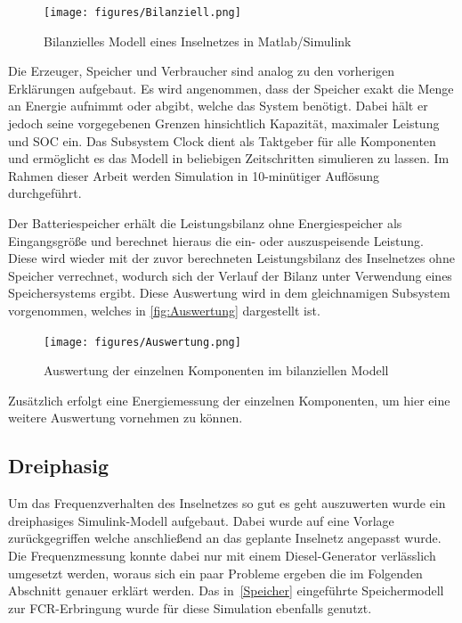 \begin{figure}[H]
	\centering
	\texttt{[image: figures/Bilanziell.png]}
	\caption{Bilanzielles Modell eines Inselnetzes in Matlab/Simulink}
	\label{fig:Bilanziell}
\end{figure}

Die Erzeuger, Speicher und Verbraucher sind analog zu den vorherigen Erklärungen aufgebaut. Es wird angenommen, dass der Speicher exakt die Menge an Energie aufnimmt oder abgibt, welche das System benötigt. Dabei hält er jedoch seine vorgegebenen Grenzen hinsichtlich Kapazität, maximaler Leistung und SOC ein. Das Subsystem Clock dient als Taktgeber für alle Komponenten und ermöglicht es das Modell in beliebigen Zeitschritten simulieren zu lassen. Im Rahmen dieser Arbeit werden Simulation in 10-minütiger Auflösung durchgeführt.


Der Batteriespeicher erhält die Leistungsbilanz ohne Energiespeicher als Eingangsgröße und berechnet hieraus die ein- oder auszuspeisende Leistung. Diese wird wieder mit der zuvor berechneten Leistungsbilanz des Inselnetzes ohne Speicher verrechnet, wodurch sich der Verlauf der Bilanz unter Verwendung eines Speichersystems ergibt. Diese Auswertung wird in dem gleichnamigen Subsystem vorgenommen, welches in \autoref{fig:Auswertung} dargestellt ist.

\begin{figure}[H]
	\centering
	\texttt{[image: figures/Auswertung.png]}
	\caption{Auswertung der einzelnen Komponenten im bilanziellen Modell}
	\label{fig:Auswertung}
\end{figure}

Zusätzlich erfolgt eine Energiemessung der einzelnen Komponenten, um hier eine weitere Auswertung vornehmen zu können.

\subsection{Dreiphasig}\label{3phase}
Um das Frequenzverhalten des Inselnetzes so gut es geht auszuwerten wurde ein dreiphasiges Simulink-Modell aufgebaut.
Dabei wurde auf eine Vorlage zurückgegriffen welche anschließend an das geplante Inselnetz angepasst wurde.
Die Frequenzmessung konnte dabei nur mit einem Diesel-Generator verlässlich umgesetzt werden, woraus sich ein paar Probleme ergeben
die im Folgenden Abschnitt genauer erklärt werden.
Das in~\ref{Speicher} eingeführte Speichermodell zur FCR-Erbringung wurde für diese Simulation ebenfalls genutzt.

